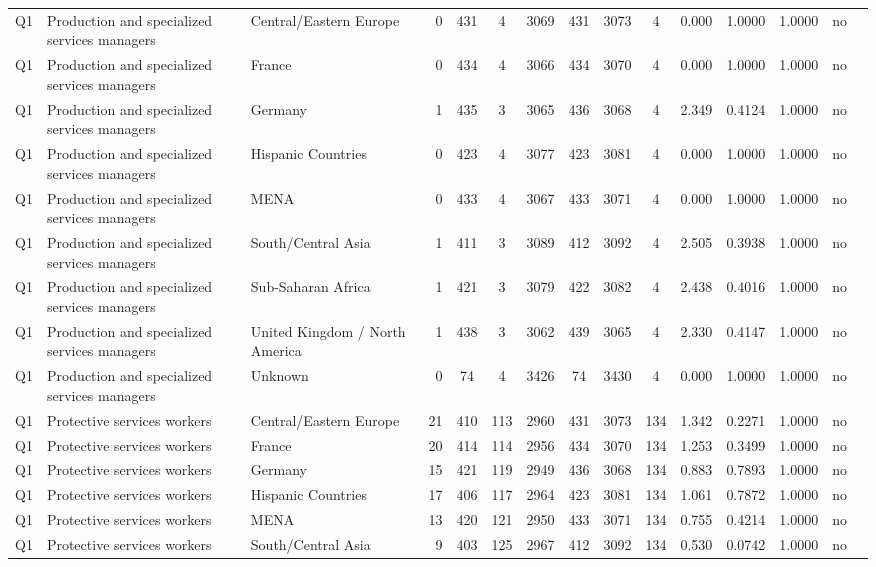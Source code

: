 \begin{longtable}{lllrcccccccccll}
Q1 & Production and specialized services managers & Central/Eastern Europe & 0 & 431 & 4 & 3069 & 431 & 3073 & 4 & 0.000 & 1.0000 & 1.0000 & no \\
Q1 & Production and specialized services managers & France & 0 & 434 & 4 & 3066 & 434 & 3070 & 4 & 0.000 & 1.0000 & 1.0000 & no \\
Q1 & Production and specialized services managers & Germany & 1 & 435 & 3 & 3065 & 436 & 3068 & 4 & 2.349 & 0.4124 & 1.0000 & no \\
Q1 & Production and specialized services managers & Hispanic Countries & 0 & 423 & 4 & 3077 & 423 & 3081 & 4 & 0.000 & 1.0000 & 1.0000 & no \\
Q1 & Production and specialized services managers & MENA & 0 & 433 & 4 & 3067 & 433 & 3071 & 4 & 0.000 & 1.0000 & 1.0000 & no \\
Q1 & Production and specialized services managers & South/Central Asia & 1 & 411 & 3 & 3089 & 412 & 3092 & 4 & 2.505 & 0.3938 & 1.0000 & no \\
Q1 & Production and specialized services managers & Sub-Saharan Africa & 1 & 421 & 3 & 3079 & 422 & 3082 & 4 & 2.438 & 0.4016 & 1.0000 & no \\
Q1 & Production and specialized services managers & United Kingdom / North America & 1 & 438 & 3 & 3062 & 439 & 3065 & 4 & 2.330 & 0.4147 & 1.0000 & no \\
Q1 & Production and specialized services managers & Unknown & 0 & 74 & 4 & 3426 & 74 & 3430 & 4 & 0.000 & 1.0000 & 1.0000 & no \\
Q1 & Protective services workers & Central/Eastern Europe & 21 & 410 & 113 & 2960 & 431 & 3073 & 134 & 1.342 & 0.2271 & 1.0000 & no \\
Q1 & Protective services workers & France & 20 & 414 & 114 & 2956 & 434 & 3070 & 134 & 1.253 & 0.3499 & 1.0000 & no \\
Q1 & Protective services workers & Germany & 15 & 421 & 119 & 2949 & 436 & 3068 & 134 & 0.883 & 0.7893 & 1.0000 & no \\
Q1 & Protective services workers & Hispanic Countries & 17 & 406 & 117 & 2964 & 423 & 3081 & 134 & 1.061 & 0.7872 & 1.0000 & no \\
Q1 & Protective services workers & MENA & 13 & 420 & 121 & 2950 & 433 & 3071 & 134 & 0.755 & 0.4214 & 1.0000 & no \\
Q1 & Protective services workers & South/Central Asia & 9 & 403 & 125 & 2967 & 412 & 3092 & 134 & 0.530 & 0.0742 & 1.0000 & no \\

\end{longtable}
